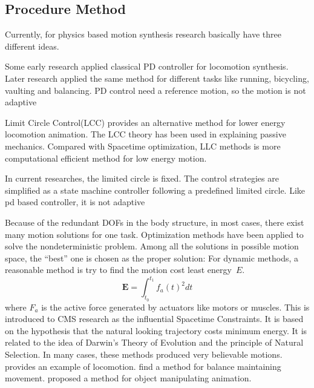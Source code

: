 \subsection{Procedure Method}
Currently, for physics based motion synthesis research basically have three different ideas.
\begin{itemize}
Some early research applied classical PD controller \citep{Raibert1991} for locomotion synthesis.
Later research \citep{Hodgins1995} applied the same method for different tasks like running, bicycling, vaulting and balancing. 
PD control need a reference motion, so the motion is not adaptive


Limit Circle Control(LCC) \citep{Laszlo1996} provides an alternative method for lower energy locomotion animation. 
The LCC theory has been used in explaining passive mechanics.  
Compared with Spacetime optimization, LLC methods is more computational efficient method for low energy motion.

In current researches\citep{Coros2009,Laszlo1996}, the limited circle is fixed.
The control strategies are simplified as a state machine controller following a predefined limited circle.
Like pd based controller, it is not adaptive



 


Because of the redundant DOFs in the body structure, in most cases, there exist many motion solutions for one task.
Optimization methods have been applied to solve the nondeterministic problem. 
Among all the solutions in possible motion space, the ``best'' one is chosen as the proper solution:
For dynamic methods, a reasonable method is try to find the motion cost least energy~$E$. 
\begin{equation}
 \textbf{E}=\int_{t_0}^{t_1}f_{a}(t)^2dt
\end{equation}
where $F_{a}$ is the active force generated by actuators like motors or muscles. 
This is introduced to CMS research as the influential Spacetime Constraints\citep{Witkin1988}. 
It is based on the hypothesis that the natural looking trajectory costs minimum energy. 
It is related to the idea of Darwin's Theory of Evolution and the principle of Natural Selection. 
In many cases, these methods produced very believable motions. 
\citet{Jain2009} provides an example of locomotion.  
\citet{BalanceControl} find a method for balance maintaining movement. 
\citet{Liu2009} proposed a method for object manipulating animation. 
\end{itemize}
